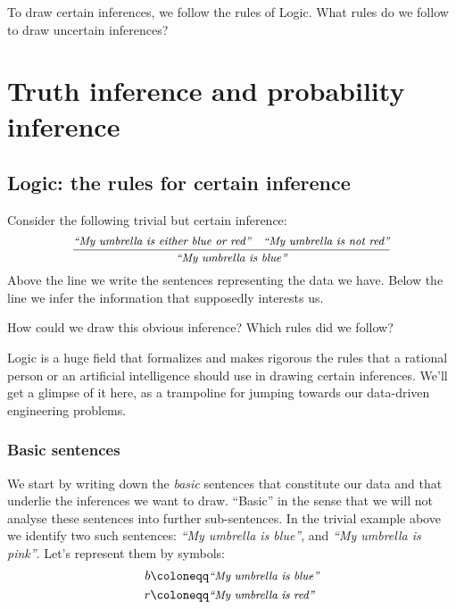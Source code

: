 \documentclass[
  letterpaper,
  DIV=11,
  numbers=noendperiod,
  oneside]{scrreprt}
\begin{document}
To draw certain inferences, we follow the rules of Logic. What rules do
we follow to draw uncertain inferences?


\hypertarget{truth-inference-and-probability-inference}{%
\chapter{Truth inference and probability
inference}\label{truth-inference-and-probability-inference}}

\hypertarget{logic-the-rules-for-certain-inference}{%
\section{Logic: the rules for certain
inference}\label{logic-the-rules-for-certain-inference}}

Consider the following trivial but certain inference: \[
\frac{
\textit{\small``My umbrella is either blue or red''}\quad
\textit{\small``My umbrella is not red''}
}{
\textit{\small``My umbrella is blue''}
}
\] Above the line we write the sentences representing the data we have.
Below the line we infer the information that supposedly interests us.

How could we draw this obvious inference? Which rules did we follow?

Logic is a huge field that formalizes and makes rigorous the rules that
a rational person or an artificial intelligence should use in drawing
certain inferences. We'll get a glimpse of it here, as a trampoline for
jumping towards our data-driven engineering problems.

\hypertarget{basic-sentences}{%
\subsection{Basic sentences}\label{basic-sentences}}

We start by writing down the \emph{basic} sentences that constitute our data and that underlie
the inferences we want to draw. ``Basic'' in the sense that we will not
analyse these sentences into further sub-sentences. In the trivial
example above we identify two such sentences: \emph{``My umbrella is
blue''}, and \emph{``My umbrella is pink''}. Let's represent them by
symbols: \[
\begin{aligned}
b &\coloneqq \textit{\small``My umbrella is blue''}
\\
r &\coloneqq \textit{\small``My umbrella is red''}
\end{aligned}
\]
\end{document}
